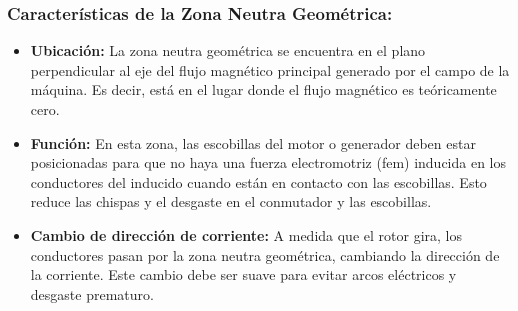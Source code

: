 \subsubsection*{Características de la Zona Neutra Geométrica:}
\begin{itemize}
    \item \textbf{Ubicación:} La zona neutra geométrica se encuentra en el plano perpendicular al eje del flujo magnético principal generado por el campo de la máquina. Es decir, está en el lugar donde el flujo magnético es teóricamente cero.
    
    \item \textbf{Función:} En esta zona, las escobillas del motor o generador deben estar posicionadas para que no haya una fuerza electromotriz (fem) inducida en los conductores del inducido cuando están en contacto con las escobillas. Esto reduce las chispas y el desgaste en el conmutador y las escobillas.
    
    \item \textbf{Cambio de dirección de corriente:} A medida que el rotor gira, los conductores pasan por la zona neutra geométrica, cambiando la dirección de la corriente. Este cambio debe ser suave para evitar arcos eléctricos y desgaste prematuro.
\end{itemize}
